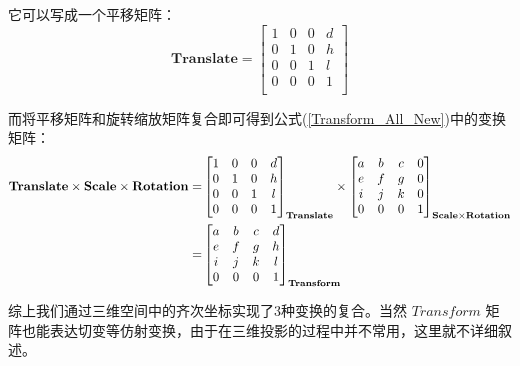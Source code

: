 \documentclass[12pt,oneside,a4paper]{ctexart}
\begin{document}
它可以写成一个平移矩阵：
\begin{equation}
	\mathbf{Translate}=
	\begin{bmatrix}
		1 & 0 & 0 & d \\
		0 & 1 & 0 & h \\
		0 & 0 & 1 & l \\
		0 & 0 & 0 & 1 \\
	\end{bmatrix}
	\label{Translate_Matrix}
\end{equation}

而将平移矩阵和旋转缩放矩阵复合即可得到公式(\ref{Transform_All_New})中的变换矩阵：
\begin{align}
	\mathbf{Translate}\times \mathbf{Scale}\times \mathbf{Rotation}= &
	\begin{bmatrix}
		1 & 0 & 0 & d \\
		0 & 1 & 0 & h \\
		0 & 0 & 1 & l \\
		0 & 0 & 0 & 1 \\
	\end{bmatrix}_{\mathbf{Translate}}
	\times
	\begin{bmatrix}
		a & b & c & 0 \\
		e & f & g & 0 \\
		i & j & k & 0 \\
		0 & 0 & 0 & 1
	\end{bmatrix}_{\mathbf{Scale}\times \mathbf{Rotation}}         \notag                                       \\
	=                                                                & \begin{bmatrix}
		a & b & c & d \\
		e & f & g & h \\
		i & j & k & l \\
		0 & 0 & 0 & 1
	\end{bmatrix}_{\mathbf{Transform}}\notag
\end{align}

综上我们通过三维空间中的齐次坐标实现了3种变换的复合。当然 $Transform$ 矩阵也能表达切变等仿射变换，由于在三维投影的过程中并不常用，这里就不详细叙述。
\end{document}

